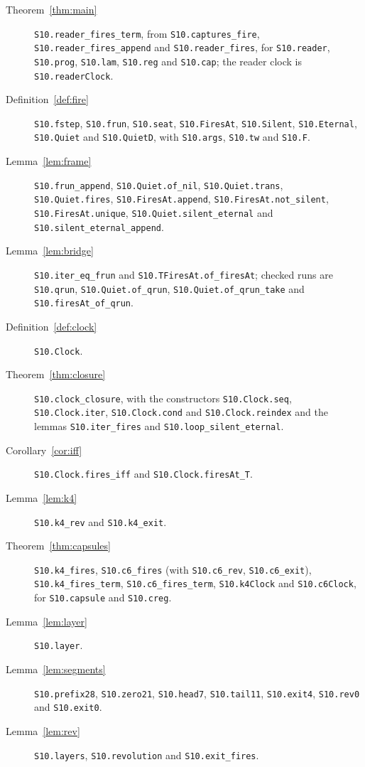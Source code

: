 \documentclass[11pt]{amsart}
\theoremstyle{definition}
\begin{document}
{\raggedright
\begin{description}
\item[Theorem~\ref{thm:main}] \texttt{S10.reader\_fires\_term}, from \texttt{S10.captures\_fire},
\texttt{S10.reader\_fires\_append} and \texttt{S10.reader\_fires}, for \texttt{S10.reader},
\texttt{S10.prog}, \texttt{S10.lam}, \texttt{S10.reg} and \texttt{S10.cap}; the reader clock is
\texttt{S10.readerClock}.
\item[Definition~\ref{def:fire}] \texttt{S10.fstep}, \texttt{S10.frun}, \texttt{S10.seat},
\texttt{S10.FiresAt}, \texttt{S10.Silent}, \texttt{S10.Eternal}, \texttt{S10.Quiet} and
\texttt{S10.QuietD}, with \texttt{S10.args}, \texttt{S10.tw} and \texttt{S10.F}.
\item[Lemma~\ref{lem:frame}] \texttt{S10.frun\_append}, \texttt{S10.Quiet.of\_nil},
\texttt{S10.Quiet.trans}, \texttt{S10.Quiet.fires}, \texttt{S10.FiresAt.append},
\texttt{S10.FiresAt.not\_silent}, \texttt{S10.FiresAt.unique},
\texttt{S10.Quiet.silent\_eternal} and \texttt{S10.silent\_eternal\_append}.
\item[Lemma~\ref{lem:bridge}] \texttt{S10.iter\_eq\_frun} and \texttt{S10.TFiresAt.of\_firesAt};
checked runs are \texttt{S10.qrun}, \texttt{S10.Quiet.of\_qrun}, \texttt{S10.Quiet.of\_qrun\_take}
and \texttt{S10.firesAt\_of\_qrun}.
\item[Definition~\ref{def:clock}] \texttt{S10.Clock}.
\item[Theorem~\ref{thm:closure}] \texttt{S10.clock\_closure}, with the constructors
\texttt{S10.Clock.seq}, \texttt{S10.Clock.iter}, \texttt{S10.Clock.cond} and
\texttt{S10.Clock.reindex} and the lemmas \texttt{S10.iter\_fires} and
\texttt{S10.loop\_silent\_eternal}.
\item[Corollary~\ref{cor:iff}] \texttt{S10.Clock.fires\_iff} and \texttt{S10.Clock.firesAt\_T}.
\item[Lemma~\ref{lem:k4}] \texttt{S10.k4\_rev} and \texttt{S10.k4\_exit}.
\item[Theorem~\ref{thm:capsules}] \texttt{S10.k4\_fires}, \texttt{S10.c6\_fires} (with
\texttt{S10.c6\_rev}, \texttt{S10.c6\_exit}), \texttt{S10.k4\_fires\_term},
\texttt{S10.c6\_fires\_term}, \texttt{S10.k4Clock} and \texttt{S10.c6Clock}, for
\texttt{S10.capsule} and \texttt{S10.creg}.
\item[Lemma~\ref{lem:layer}] \texttt{S10.layer}.
\item[Lemma~\ref{lem:segments}] \texttt{S10.prefix28}, \texttt{S10.zero21}, \texttt{S10.head7},
\texttt{S10.tail11}, \texttt{S10.exit4}, \texttt{S10.rev0} and \texttt{S10.exit0}.
\item[Lemma~\ref{lem:rev}] \texttt{S10.layers}, \texttt{S10.revolution} and
\texttt{S10.exit\_fires}.
\end{description}
\par}



\end{document}
